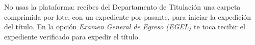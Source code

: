 \documentclass[11pt,a4paper]{article}
\begin{document}
{\small\tableofcontents}
\newpage
\begin{quevasahacer}
No usas la plataforma: recibes del Departamento de Titulación una carpeta comprimida por lote, con un expediente por pasante, para iniciar la expedición del título. En la opción \emph{Examen General de Egreso (EGEL)} te toca recibir el expediente verificado para expedir el título.
\end{quevasahacer}



\end{document}
